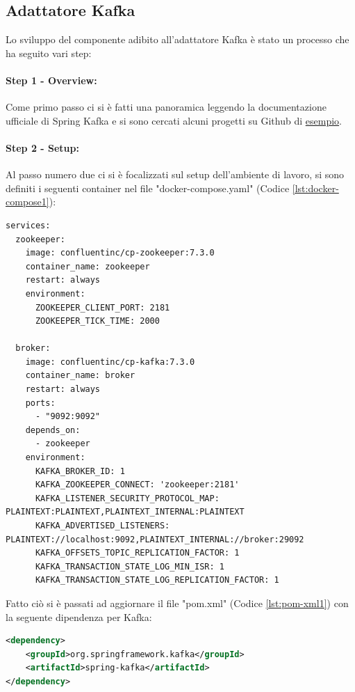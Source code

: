 
\subsection{Adattatore Kafka}
Lo sviluppo del componente adibito all'adattatore Kafka è stato un processo che ha seguito vari step:
\paragraph{Step 1 - Overview:}
Come primo passo ci si è fatti una panoramica leggendo la documentazione ufficiale di Spring Kafka \cite{SpringKafka} e si sono cercati alcuni progetti su Github di \href{https://github.com/devtiro/spring-boot-kafka-tutorial/tree/main}{esempio}.
\paragraph{Step 2 - Setup:}
Al passo numero due ci si è focalizzati sul setup dell’ambiente di lavoro, si sono definiti i seguenti container nel file "docker-compose.yaml" (Codice \vref{lst:docker-compose1}):
\begin{lstlisting}[language=docker-compose, caption={Setup del docker-compose.yaml per l'adattatore Kafka}, label=lst:docker-compose1]
services:  
  zookeeper:
    image: confluentinc/cp-zookeeper:7.3.0
    container_name: zookeeper
    restart: always
    environment:
      ZOOKEEPER_CLIENT_PORT: 2181
      ZOOKEEPER_TICK_TIME: 2000

  broker:
    image: confluentinc/cp-kafka:7.3.0
    container_name: broker
    restart: always
    ports:
      - "9092:9092"
    depends_on:
      - zookeeper
    environment:
      KAFKA_BROKER_ID: 1
      KAFKA_ZOOKEEPER_CONNECT: 'zookeeper:2181'
      KAFKA_LISTENER_SECURITY_PROTOCOL_MAP: PLAINTEXT:PLAINTEXT,PLAINTEXT_INTERNAL:PLAINTEXT
      KAFKA_ADVERTISED_LISTENERS: PLAINTEXT://localhost:9092,PLAINTEXT_INTERNAL://broker:29092
      KAFKA_OFFSETS_TOPIC_REPLICATION_FACTOR: 1
      KAFKA_TRANSACTION_STATE_LOG_MIN_ISR: 1
      KAFKA_TRANSACTION_STATE_LOG_REPLICATION_FACTOR: 1
\end{lstlisting}
Fatto ciò si è passati ad aggiornare il file "pom.xml" (Codice \vref{lst:pom-xml1}) con la seguente dipendenza per Kafka: 
\begin{lstlisting}[language=XML, caption={Aggiornamento dipendenze nel pom.xml per includere spring-kafka}, label=lst:pom-xml1]
<dependency>
    <groupId>org.springframework.kafka</groupId>
    <artifactId>spring-kafka</artifactId>
</dependency>
\end{lstlisting}
